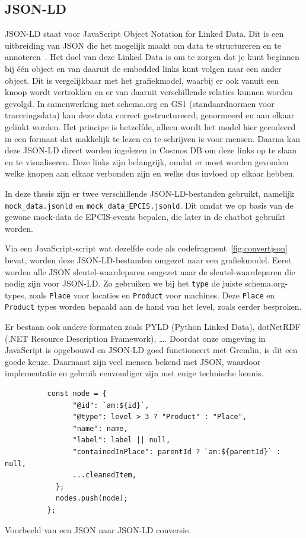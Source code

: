 \subsection{JSON-LD}
JSON-LD staat voor JavaScript Object Notation for Linked Data. Dit is een uitbreiding van JSON die het mogelijk maakt om data te structureren en te annoteren~\autocite{jsonld.org}.
Het doel van deze Linked Data is om te zorgen dat je kunt beginnen bij één object en van daaruit de embedded links kunt volgen naar een ander object.
Dit is vergelijkbaar met het grafiekmodel, waarbij er ook vanuit een knoop wordt vertrokken en er van daaruit verschillende relaties kunnen worden gevolgd.
In samenwerking met schema.org en GS1 (standaardnormen voor traceringsdata) kan deze data correct gestructureerd, genormeerd en aan elkaar gelinkt worden.
Het principe is hetzelfde, alleen wordt het model hier gecodeerd in een formaat dat makkelijk te lezen en te schrijven is voor mensen.
Daarna kan deze JSON-LD direct worden ingelezen in Cosmos DB om deze links op te slaan en te visualiseren.
Deze links zijn belangrijk, omdat er moet worden gevonden welke knopen aan elkaar verbonden zijn en welke dus invloed op elkaar hebben.

In deze thesis zijn er twee verschillende JSON-LD-bestanden gebruikt, namelijk \texttt{mock\_data.jsonld} en \texttt{mock\_data\_EPCIS.jsonld}.
Dit omdat we op basis van de gewone mock-data de EPCIS-events bepalen, die later in de chatbot gebruikt worden.

Via een JavaScript-script wat dezelfde code als codefragment~\ref{fig:convertjson} bevat, worden deze JSON-LD-bestanden omgezet naar een grafiekmodel.
Eerst worden alle JSON sleutel-waardeparen omgezet naar de sleutel-waardeparen die nodig zijn voor JSON-LD.\@
Zo gebruiken we bij het \texttt{type} de juiste schema.org-types, zoals \texttt{Place} voor locaties en \texttt{Product} voor machines.
Deze \texttt{Place} en \texttt{Product} types worden bepaald aan de hand van het level, zoals eerder besproken.

Er bestaan ook andere formaten zoals PYLD (Python Linked Data), dotNetRDF (.NET Resource Description Framework), \dots. 
Doordat onze omgeving in JavaScript is opgebouwd en JSON-LD goed functioneert met Gremlin, is dit een goede keuze.
Daarnaast zijn veel mensen bekend met JSON, waardoor implementatie en gebruik eenvoudiger zijn met enige technische kennis.

\begin{listing} [H]
     \begin{verbatim}
          const node = {
                "@id": `am:${id}`,
                "@type": level > 3 ? "Product" : "Place",
                "name": name,
                "label": label || null,
                "containedInPlace": parentId ? `am:${parentId}` : null,
                ...cleanedItem,
            };
            nodes.push(node);
          };
     \end{verbatim}
     \caption[Voorbeeld van een JSON naar JSON-LD conversie]{\label{fig:convertjson}Voorbeeld van een JSON naar JSON-LD conversie.}
\end{listing}

